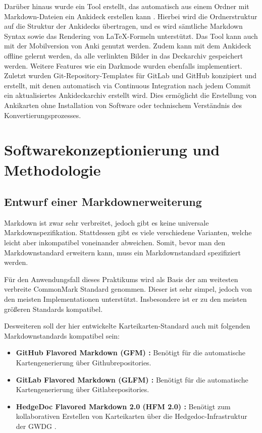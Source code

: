 \documentclass[ngerman]{article}
\begin{document}
Darüber hinaus wurde ein Tool erstellt, das automatisch aus einem Ordner mit Markdown-Dateien ein Ankideck erstellen kann \cite{Ankiding}. Hierbei wird die Ordnerstruktur auf die Struktur der Ankidecks übertragen, und es wird sämtliche Markdown Syntax sowie das Rendering von \LaTeX-Formeln unterstützt. Das Tool kann auch mit der Mobilversion von Anki genutzt werden. Zudem kann mit dem Ankideck offline gelernt werden, da alle verlinkten Bilder in das Deckarchiv gespeichert werden. Weitere Features wie ein Darkmode wurden ebenfalls implementiert.\\

Zuletzt wurden Git-Repository-Templates für GitLab \cite{GitlabTemplate} und GitHub \cite{GithubTemplate} konzipiert und erstellt, mit denen automatisch via Continuous Integration nach jedem Commit ein aktualisiertes Ankideckarchiv erstellt wird. Dies ermöglicht die Erstellung von Ankikarten ohne Installation von Software oder technischem Verständnis des Konvertierungsprozesses.

\newpage


\section{Softwarekonzeptionierung und Methodologie}
\subsection{Entwurf einer Markdownerweiterung}
Markdown ist zwar sehr verbreitet, jedoch gibt es keine universale Markdownspezifikation. Stattdessen gibt es viele verschiedene Varianten, welche leicht aber inkompatibel voneinander abweichen. Somit, bevor man den Markdownstandard erweitern kann, muss ein Markdownstandard spezifiziert werden.

Für den Anwendungsfall dieses Praktikums wird als Basis der am weitesten verbreite CommonMark \cite{CommonMark} Standard genommen. Dieser ist sehr simpel, jedoch von den meisten Implementationen unterstützt. Insbesondere ist er zu den meisten größeren Standards kompatibel.

Desweiteren soll der hier entwickelte Karteikarten-Standard auch mit folgenden Markdownstandards kompatibel sein:
\begin{itemize}
  \item \textbf{GitHub Flavored Markdown (GFM) \cite{GFM}:} Benötigt für die automatische Kartengenerierung über Githubrepositories.
  \item \textbf{GitLab Flavored Markdown (GLFM) \cite{GLFM} :} Benötigt für die automatische Kartengenerierung über Gitlabrepositories.
  \item \textbf{HedgeDoc Flavored Markdown 2.0 (HFM 2.0) \cite{HFM2}:} Benötigt zum kollaborativen Erstellen von Karteikarten über die Hedgedoc-Infrastruktur der GWDG \cite{HedgeDocGWDG}.
\end{itemize}
\end{document}
